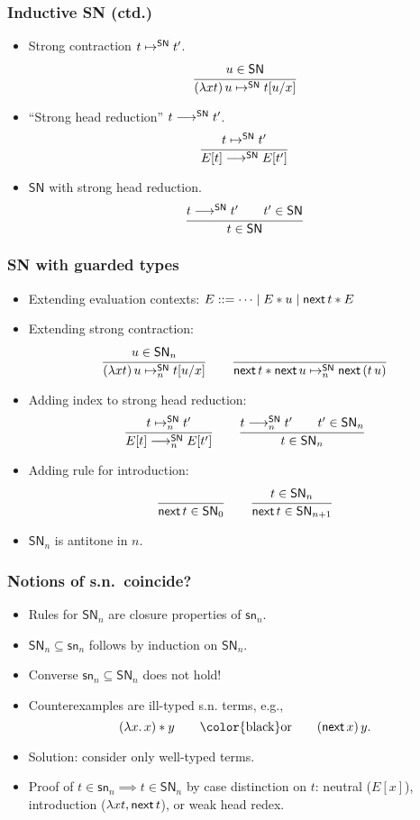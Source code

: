\documentclass[t]{beamer}
\newcommand{\mybox}[1]{\mbox{\color{black}#1}}
\newcommand{\nex}{\tnext\,}
\newcommand{\contrSN}{\contr^\SN}
\newcommand{\redSN}{\red^\SN}
\renewcommand{\sn}{\mathsf{sn}}
\renewcommand{\SN}{\mathsf{SN}}
\begin{document}
\begin{frame}%
  \frametitle{Inductive SN (ctd.)}
  \begin{itemize}
  \item Strong contraction $t \contrSN t'$.
\[
  \ru{u \in \SN
    }{(\lambda x t)\,u \contrSN \subst u x t}
\]
  \item ``Strong head reduction'' $t \redSN t'$.
\[
  \ru{t \contrSN t'}{E[t] \redSN E[t']}
\]
  \item $\SN$ with strong head reduction.
\[
  \ru{t \redSN t' \qquad t' \in \SN
    }{t \in \SN}
\]
  \end{itemize}
\end{frame}


\begin{frame}%
  \frametitle{SN with guarded types}
  \begin{itemize}
  \item Extending evaluation contexts:
\(
  E ::= \dots \mid E \ast u \mid \nex t \ast E
\)
  \item Extending strong contraction:
\[
  \ru{u \in \SN_n
    }{(\lambda x t)\,u \contrSN_n \subst u x t}
\qquad
  \ru{}{\nex t \ast \nex u \contrSN_n \nex (t\,u)}
\]
\vspace{-2ex}
  \item Adding index to strong head reduction:
\[
  \ru{t \contrSN_n t'}{E[t] \redSN_n E[t']}
\qquad
  \ru{t \redSN_n t' \qquad t' \in \SN_n
    }{t \in \SN_n}
\]
\vspace{-2ex}
  \item Adding rule for introduction:
\vspace{-2ex}
\[
  \ru{}{\nex t \in \SN_0}
\qquad
  \ru{t \in \SN_n
    }{\nex t \in \SN_{n+1}}
\]
\vspace{-2ex}
\item $\SN_n$ is antitone in $n$.
  \end{itemize}
\end{frame}


\begin{frame}%
  \frametitle{Notions of s.n.\ coincide?}
  \begin{itemize}
  \item Rules for $\SN_n$ are closure properties of $\sn_n$.
  \item $\SN_n \subseteq \sn_n$ follows by induction on $\SN_n$.
  \item Converse $\sn_n \subseteq \SN_n$ does not hold!
  \item Counterexamples are ill-typed s.n. terms, e.g.,
\[
  (\lambda x.\, x) \ast y
\qquad \mybox{or}\qquad
  (\nex x)\,y
.\]
  \item Solution: consider only well-typed terms.
  \item Proof of $t \in \sn_n \implies t \in \SN_n$ by case
    distinction on $t$: neutral ($E[x]$), introduction ($\lambda
    x t, \nex t$), or weak head redex.
  \end{itemize}
\end{frame}
\end{document}
